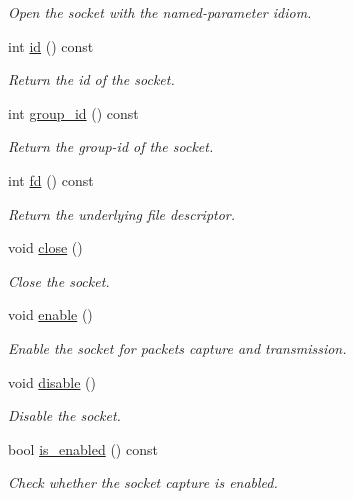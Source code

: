 \begin{DoxyCompactItemize}
\begin{DoxyCompactList}\small\item\em Open the socket with the named-\/parameter idiom. \end{DoxyCompactList}\item 
int \hyperlink{classpfq_1_1socket_a78e4376b28f6eef5b126018197522d30}{id} () const
\begin{DoxyCompactList}\small\item\em Return the id of the socket. \end{DoxyCompactList}\item 
int \hyperlink{classpfq_1_1socket_a469d06a58cfbe1a24893ce619218d536}{group\+\_\+id} () const
\begin{DoxyCompactList}\small\item\em Return the group-\/id of the socket. \end{DoxyCompactList}\item 
int \hyperlink{classpfq_1_1socket_a159189ab268469b3a6c438747a5bbb8c}{fd} () const
\begin{DoxyCompactList}\small\item\em Return the underlying file descriptor. \end{DoxyCompactList}\item 
void \hyperlink{classpfq_1_1socket_a4c179188ea8fceeb5fd47d52f93c6bda}{close} ()
\begin{DoxyCompactList}\small\item\em Close the socket. \end{DoxyCompactList}\item 
void \hyperlink{classpfq_1_1socket_a5b25af762946405695f4192b08c04146}{enable} ()
\begin{DoxyCompactList}\small\item\em Enable the socket for packets capture and transmission. \end{DoxyCompactList}\item 
void \hyperlink{classpfq_1_1socket_ac7e918bff7d1672125a8549dae750dcc}{disable} ()
\begin{DoxyCompactList}\small\item\em Disable the socket. \end{DoxyCompactList}\item 
bool \hyperlink{classpfq_1_1socket_af414e42b71611f6c8ed44c9e7f57ff41}{is\+\_\+enabled} () const
\begin{DoxyCompactList}\small\item\em Check whether the socket capture is enabled. \end{DoxyCompactList}\item 

\end{DoxyCompactItemize}
